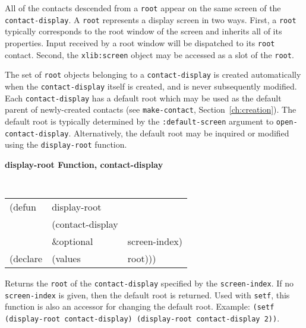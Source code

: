 \documentclass[twoside]{book}
\begin{document}
\begin{sloppy}
\begin{flushright}
{}\end{flushright}



All of the contacts descended from a {\tt root} appear on the same screen of
the {\tt contact-display}. A {\tt root} represents a display screen in
two ways. First, a {\tt root} typically corresponds to the root window of the
screen and inherits all of its properties\footnotemark{}. 
Input received by a root window
will be dispatched to its {\tt root} contact. Second, the  {\tt xlib:screen} object
may be accessed as a slot of the {\tt root}.

The set of {\tt root} objects belonging to a {\tt contact-display} is
created
automatically when the {\tt contact-display} itself is created, and is never
subsequently modified. Each {\tt contact-display} has a default root which may
be used as the default parent of newly-created contacts (see
{\tt make-contact}, Section~\ref{ch:creation}).
The default
root is typically determined by the {\tt :default-screen} argument to
{\tt open-contact-display}.
Alternatively, the default root may be inquired or modified using the
{\tt display-root} function.

{\samepage
{\large {\bf display-root \hfill Function, contact-display}}
\begin{flushright} \parbox[t]{6.125in}{
\tt
\begin{tabular}{lll}
\raggedright
(defun & display-root & \\ 
& (contact-display\\
& \&optional &  screen-index) \\
(declare &(values  & root)))
\end{tabular}
\rm

}\end{flushright}
}

\begin{flushright} \parbox[t]{6.125in}{
Returns the  {\tt root} of the {\tt contact-display} specified by the
{\tt screen-index}. If no {\tt screen-index} is given, then the default
root is returned. Used
with {\tt setf}, this function is also an accessor for
changing the default root. Example: {\tt (setf (display-root  
contact-display) (display-root contact-display 2))}.

}
\end{flushright}
\end{sloppy}
\end{document}
